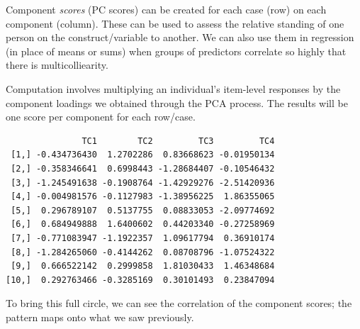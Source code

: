 \documentclass[
  english,
]{book}
\newenvironment{Shaded}{\begin{snugshade}}{\end{snugshade}}
\newcommand{\CommentTok}[1]{\textcolor[rgb]{0.56,0.35,0.01}{\textit{#1}}}
\newcommand{\DataTypeTok}[1]{\textcolor[rgb]{0.13,0.29,0.53}{#1}}
\newcommand{\DecValTok}[1]{\textcolor[rgb]{0.00,0.00,0.81}{#1}}
\newcommand{\KeywordTok}[1]{\textcolor[rgb]{0.13,0.29,0.53}{\textbf{#1}}}
\newcommand{\NormalTok}[1]{#1}
\newcommand{\OperatorTok}[1]{\textcolor[rgb]{0.81,0.36,0.00}{\textbf{#1}}}
\newcommand{\OtherTok}[1]{\textcolor[rgb]{0.56,0.35,0.01}{#1}}
\newcommand{\StringTok}[1]{\textcolor[rgb]{0.31,0.60,0.02}{#1}}
\begin{document}
Component \emph{scores} (PC scores) can be created for each case (row) on each component (column). These can be used to assess the relative standing of one person on the construct/variable to another. We can also use them in regression (in place of means or sums) when groups of predictors correlate so highly that there is multicolliearity.

Computation involves multiplying an individual's item-level responses by the component loadings we obtained through the PCA process. The results will be one score per component for each row/case.

\begin{Shaded}
\end{Shaded}

\begin{verbatim}
               TC1        TC2         TC3         TC4
 [1,] -0.434736430  1.2702286  0.83668623 -0.01950134
 [2,] -0.358346641  0.6998443 -1.28684407 -0.10546432
 [3,] -1.245491638 -0.1908764 -1.42929276 -2.51420936
 [4,] -0.004981576 -0.1127983 -1.38956225  1.86355065
 [5,]  0.296789107  0.5137755  0.08833053 -2.09774692
 [6,]  0.684949888  1.6400602  0.44203340 -0.27258969
 [7,] -0.771083947 -1.1922357  1.09617794  0.36910174
 [8,] -1.284265060 -0.4144262  0.08708796 -1.07524322
 [9,]  0.666522142  0.2999858  1.81030433  1.46348684
[10,]  0.292763466 -0.3285169  0.30101493  0.23847094
\end{verbatim}

\begin{Shaded}
\end{Shaded}

To bring this full circle, we can see the correlation of the component scores; the pattern maps onto what we saw previously.
\end{document}

